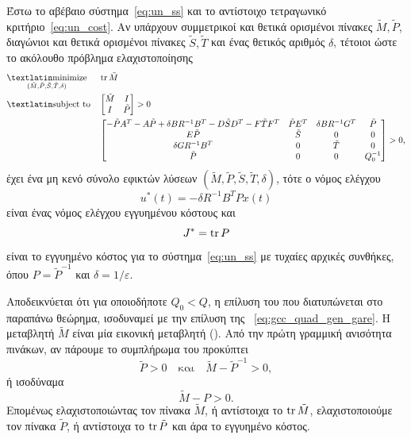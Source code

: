 \begin{theorem}
    Έστω το αβέβαιο σύστημα~\eqref{eq:un_ss} και το αντίστοιχο τετραγωνικό
    κριτήριο~\eqref{eq:un_cost}. Αν υπάρχουν συμμετρικοί και θετικά ορισμένοι
    πίνακες \( \tilde{M}, \tilde{P} \), διαγώνιοι και θετικά ορισμένοι πίνακες
    \( \tilde{S}, \tilde{T} \) και ένας θετικός αριθμός \( \delta \), τέτοιοι
    ώστε το ακόλουθο πρόβλημα ελαχιστοποίησης
    \begin{equation*}
        \begin{aligned}
            & \underset{
                (\tilde{M}, \tilde{P}, \tilde{S}, \tilde{T}, \delta)
            }{\mathtxt{minimize}}
            & & \tr \tilde{M} \\
            & \mathtxt{subject to}
            & &
            \begin{bmatrix}
                \tilde{M} & I \\
                I & \tilde{P}
            \end{bmatrix} > 0 \\
            &&&
            \begin{bmatrix}
                -\tilde{P}A^T - A\tilde{P} + \delta BR^{-1}B^T
                - D\tilde{S}D^T - F\tilde{T}F^T & \tilde{P}E^T &
                \delta BR^{-1}G^T & \tilde{P} \\
                E\tilde{P} & \tilde{S} & 0 & 0 \\
                \delta GR^{-1}B^T & 0 & \tilde{T} & 0 \\
                \tilde{P} & 0 & 0 & Q_0^{-1}\\
            \end{bmatrix} > 0,
        \end{aligned}
    \end{equation*}
    έχει ένα μη κενό σύνολο εφικτών λύσεων
    \( \left( \tilde{M}, \tilde{P}, \tilde{S}, \tilde{T}, \delta \right) \), τότε
    ο νόμος ελέγχου
    \[
        u^*(t) = -\delta R^{-1}B^TPx(t)
    \]
    είναι ένας νόμος ελέγχου εγγυημένου κόστους και
    \[
        J^* = \operatorname{tr} P
    \]
    είναι το εγγυημένο κόστος για το σύστημα~\eqref{eq:un_ss} με τυχαίες αρχικές
    συνθήκες, όπου \( P = \tilde{P}^{-1} \) και \( \delta = 1/\varepsilon \).
\end{theorem}

Αποδεικνύεται ότι για οποιοδήποτε \( Q_0 < Q \), η επίλυση του  που
διατυπώνεται στο παραπάνω θεώρημα, ισοδυναμεί με την επίλυση της
~\eqref{eq:gcc_quad_gen_gare}. Η μεταβλητή \( \tilde{M} \) είναι μία
εικονική μεταβλητή (). Από την πρώτη γραμμική ανισότητα
πινάκων, αν πάρουμε το συμπλήρωμα του  προκύπτει
\[
    \tilde{P} > 0 \quad \text{και}\quad \tilde{M} - \tilde{P}^{-1} > 0,
\]
ή ισοδύναμα
\[
    \tilde{M} - P > 0.
\]
Επομένως ελαχιστοποιώντας τον πίνακα \( \tilde{M} \), ή αντίστοιχα το
\( \operatorname{tr} \tilde{M} \), ελαχιστοποιούμε τον πίνακα \( \tilde{P} \), ή αντίστοιχα το
\( \operatorname{tr} \tilde{P} \) και άρα το εγγυημένο κόστος.

